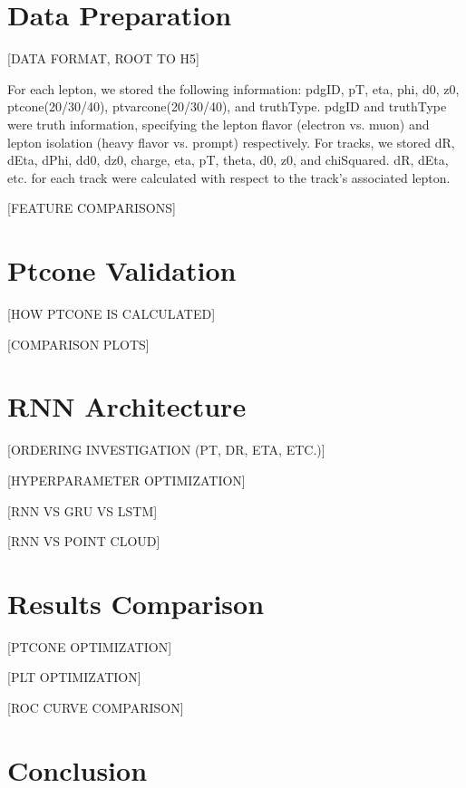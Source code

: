 \documentclass[preprint,12pt]{elsarticle}
\begin{document}
\section{Data Preparation}\label{sec:dataprep}

[DATA FORMAT, ROOT TO H5]

For each lepton, we stored the following information: pdgID, pT, eta, phi, d0, z0, ptcone(20/30/40), ptvarcone(20/30/40), and truthType. pdgID and truthType were truth information, specifying the lepton flavor (electron vs. muon) and lepton isolation (heavy flavor vs. prompt) respectively. For tracks, we stored dR, dEta, dPhi, dd0, dz0, charge, eta, pT, theta, d0, z0, and chiSquared. dR, dEta, etc. for each track were calculated with respect to the track's associated lepton.

[FEATURE COMPARISONS]

\section{Ptcone Validation}\label{sec:ptcone}

[HOW PTCONE IS CALCULATED]

[COMPARISON PLOTS]

\section{RNN Architecture}\label{sec:architecture}

[ORDERING INVESTIGATION (PT, DR, ETA, ETC.)]

[HYPERPARAMETER OPTIMIZATION]

[RNN VS GRU VS LSTM]

[RNN VS POINT CLOUD]

\section{Results Comparison}\label{sec:results}

[PTCONE OPTIMIZATION]

[PLT OPTIMIZATION]

[ROC CURVE COMPARISON]

\section{Conclusion}\label{sec:conclusion}



\end{document}
